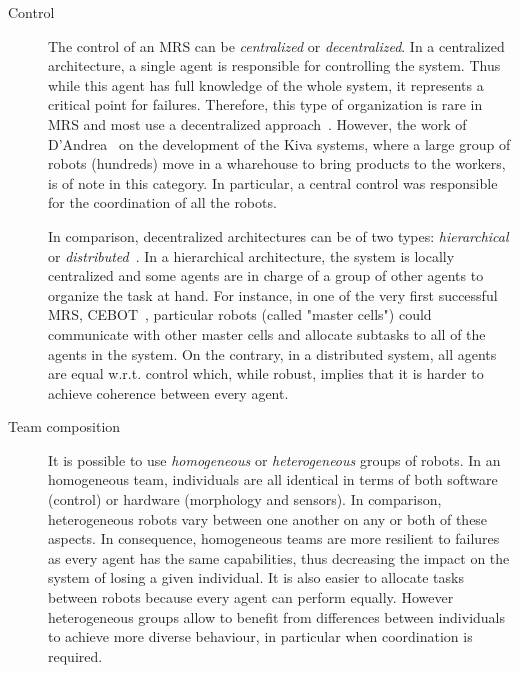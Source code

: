     \begin{description}
      \item[Control] {The control of an MRS can be \emph{centralized} or \emph{decentralized}. In a centralized architecture, a single agent is responsible for controlling the system. Thus while this agent has full knowledge of the whole system, it represents a critical point for failures. Therefore, this type of organization is rare in MRS and most use a decentralized approach~\parencite{Parker2008}. However, the work of D'Andrea~\parencite{DAndrea2012} on the development of the Kiva systems, where a large group of robots (hundreds) move in a wharehouse to bring products to the workers, is of note in this category. In particular, a central control was responsible for the coordination of all the robots. 

      In comparison, decentralized architectures can be of two types: \emph{hierarchical} or \emph{distributed}~\parencite{Cao1997}. In a hierarchical architecture, the system is locally centralized and some agents are in charge of a group of other agents to organize the task at hand. For instance, in one of the very first successful MRS, CEBOT~\parencite{Fukuda1988}, particular robots (called "master cells") could communicate with other master cells and allocate subtasks to all of the agents in the system. On the contrary, in a distributed system, all agents are equal w.r.t. control which, while robust, implies that it is harder to achieve coherence between every agent.}

      \item[Team composition] {It is possible to use \emph{homogeneous} or \emph{heterogeneous} groups of robots. In an homogeneous team, individuals are all identical in terms of both software (control) or hardware (morphology and sensors). In comparison, heterogeneous robots vary between one another on any or both of these aspects. In consequence, homogeneous teams are more resilient to failures as every agent has the same capabilities, thus decreasing the impact on the system of losing a given individual. It is also easier to allocate tasks between robots because every agent can perform equally. However heterogeneous groups allow to benefit from differences between individuals to achieve more diverse behaviour, in particular when coordination is required.}


\end{description}
